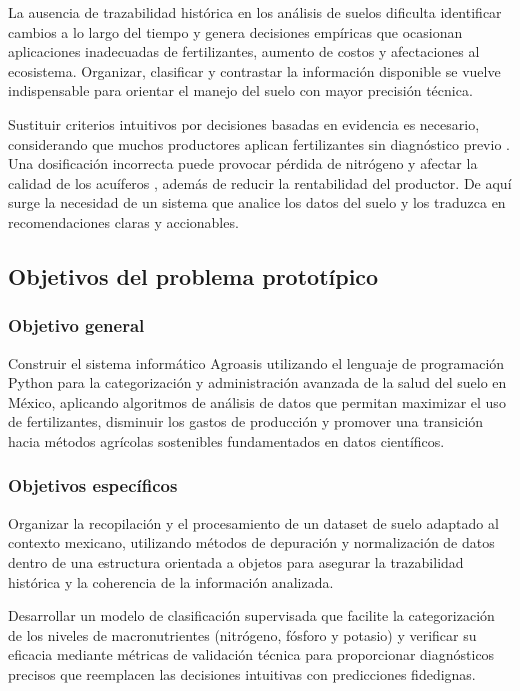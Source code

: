 \documentclass[12pt]{article}
\begin{document}
La ausencia de trazabilidad histórica en los análisis de suelos dificulta identificar cambios a lo largo del tiempo y genera decisiones empíricas que ocasionan aplicaciones inadecuadas de fertilizantes, aumento de costos y afectaciones al ecosistema. Organizar, clasificar y contrastar la información disponible se vuelve indispensable para orientar el manejo del suelo con mayor precisión técnica.

Sustituir criterios intuitivos por decisiones basadas en evidencia es necesario, considerando que muchos productores aplican fertilizantes sin diagnóstico previo \citep{sader_2020}. Una dosificación incorrecta puede provocar pérdida de nitrógeno y afectar la calidad de los acuíferos \citep{obalum_2017}, además de reducir la rentabilidad del productor. De aquí surge la necesidad de un sistema que analice los datos del suelo y los traduzca en recomendaciones claras y accionables.

\subsection{Objetivos del problema prototípico}

\subsubsection{Objetivo general}
Construir el sistema informático Agroasis utilizando el lenguaje de programación Python para la categorización y administración avanzada de la salud del suelo en México, aplicando algoritmos de análisis de datos que permitan maximizar el uso de fertilizantes, disminuir los gastos de producción y promover una transición hacia métodos agrícolas sostenibles fundamentados en datos científicos.

\subsubsection{Objetivos específicos}
Organizar la recopilación y el procesamiento de un dataset de suelo adaptado al contexto mexicano, utilizando métodos de depuración y normalización de datos dentro de una estructura orientada a objetos para asegurar la trazabilidad histórica y la coherencia de la información analizada.

Desarrollar un modelo de clasificación supervisada que facilite la categorización de los niveles de macronutrientes (nitrógeno, fósforo y potasio) y verificar su eficacia mediante métricas de validación técnica para proporcionar diagnósticos precisos que reemplacen las decisiones intuitivas con predicciones fidedignas.
\end{document}
